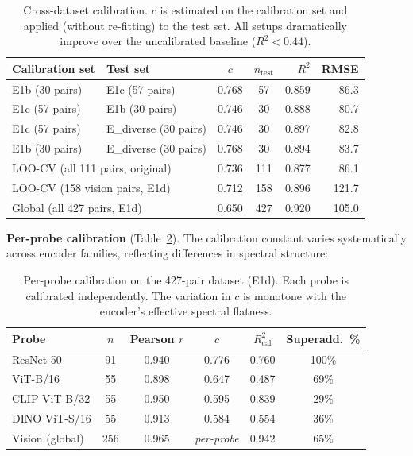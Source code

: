 \documentclass{article}
\begin{document}
\begin{table}[h]
\centering
\caption{Cross-dataset calibration.
$c$ is estimated on the calibration set and applied (without re-fitting) to the test set.
All setups dramatically improve over the uncalibrated baseline ($R^2{<}0.44$).}
\label{tab:calibration}
\small
\setlength{\tabcolsep}{4pt}
\begin{tabular}{llccrr}
\toprule
Calibration set & Test set & $c$ & $n_{\mathrm{test}}$ & $R^2$ & RMSE \\
\midrule
E1b (30 pairs) & E1c (57 pairs) & 0.768 & 57 & 0.859 & 86.3 \\
E1c (57 pairs) & E1b (30 pairs) & 0.746 & 30 & 0.888 & 80.7 \\
E1c (57 pairs) & E\_diverse (30 pairs) & 0.746 & 30 & 0.897 & 82.8 \\
E1b (30 pairs) & E\_diverse (30 pairs) & 0.768 & 30 & 0.894 & 83.7 \\
\midrule
\multicolumn{2}{l}{LOO-CV (all 111 pairs, original)} & 0.736 & 111 & 0.877 & 86.1 \\
\multicolumn{2}{l}{LOO-CV (158 vision pairs, E1d)} & 0.712 & 158 & 0.896 & 121.7 \\
\multicolumn{2}{l}{Global (all 427 pairs, E1d)} & 0.650 & 427 & 0.920 & 105.0 \\
\bottomrule
\end{tabular}\normalsize
\end{table}

\textbf{Per-probe calibration} (Table~\ref{tab:perprobe_cal}).
The calibration constant varies systematically across encoder families,
reflecting differences in spectral structure:

\begin{table}[h]
\centering
\caption{Per-probe calibration on the 427-pair dataset (E1d).
Each probe is calibrated independently.
The variation in $c$ is monotone with the encoder's effective spectral flatness.}
\label{tab:perprobe_cal}
\small
\setlength{\tabcolsep}{4pt}
\begin{tabular}{lccccc}
\toprule
Probe & $n$ & Pearson $r$ & $c$ & $R^2_{\mathrm{cal}}$ & Superadd.\ \% \\
\midrule
ResNet-50        & 91  & 0.940 & 0.776 & 0.760 & 100\% \\
ViT-B/16         & 55  & 0.898 & 0.647 & 0.487 &  69\% \\
CLIP ViT-B/32    & 55  & 0.950 & 0.595 & 0.839 &  29\% \\
DINO ViT-S/16    & 55  & 0.913 & 0.584 & 0.554 &  36\% \\
\midrule
Vision (global)  & 256 & 0.965 & \emph{per-probe} & 0.942 &  65\% \\
\bottomrule
\end{tabular}\normalsize
\end{table}
\end{document}
